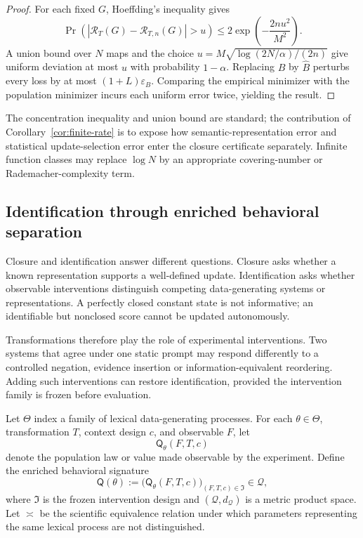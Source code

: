 \documentclass[11pt]{article}
\begin{document}
{\begin{proof}
For each fixed $G$, Hoeffding's inequality gives
\[
\Pr\left(
|\mathcal R_T(G)-\mathcal R_{T,n}(G)|>u
\right)
\le2\exp\left(-\frac{2nu^2}{M^2}\right).
\]
A union bound over $N$ maps and the choice
$u=M\sqrt{\log(2N/\alpha)/(2n)}$ give uniform deviation at most $u$ with probability $1-\alpha$. Replacing $B$ by $\widehat B$ perturbs every loss by at most $(1+L)\varepsilon_B$. Comparing the empirical minimizer with the population minimizer incurs each uniform error twice, yielding the result.
\end{proof}

The concentration inequality and union bound are standard; the contribution of Corollary~\ref{cor:finite-rate} is to expose how semantic-representation error and statistical update-selection error enter the closure certificate separately. Infinite function classes may replace $\log N$ by an appropriate covering-number or Rademacher-complexity term.

\subsection{Identification through enriched behavioral separation}

Closure and identification answer different questions.  Closure asks whether
a known representation supports a well-defined update.  Identification asks
whether observable interventions distinguish competing data-generating
systems or representations.  A perfectly closed constant state is not
informative; an identifiable but nonclosed score cannot be updated
autonomously.

Transformations therefore play the role of experimental interventions.  Two
systems that agree under one static prompt may respond differently to a
controlled negation, evidence insertion or information-equivalent reordering.
Adding such interventions can restore identification, provided the
intervention family is frozen before evaluation.

Let $\Theta$ index a family of lexical data-generating processes. For each $\theta\in\Theta$, transformation $T$, context design $c$, and observable $F$, let
\[
 \mathsf Q_\theta(F,T,c)
\]
denote the population law or value made observable by the experiment. Define the enriched behavioral signature
\[
 \mathsf Q(\theta)
 :=
 \bigl(\mathsf Q_\theta(F,T,c)\bigr)_{(F,T,c)\in\mathfrak I}
 \in\mathcal Q,
\]
where $\mathfrak I$ is the frozen intervention design and $(\mathcal Q,d_{\mathcal Q})$ is a metric product space. Let $\asymp$ be the scientific equivalence relation under which parameters representing the same lexical process are not distinguished.

}
\end{document}
